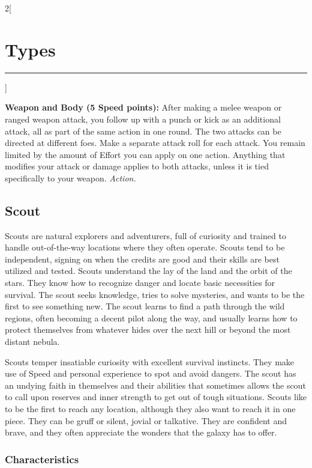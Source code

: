 \documentclass[a4paper,10pt,final]{book}
\newcommand{\HRule}{\rule{\linewidth}{0.5mm}} %
\newcommand{\newSection}[1]{\section*{#1} \addcontentsline{toc}{section}{#1} \label{sec:#1} \HRule}
\newcommand{\itemAbility}[2]{\textcolor{25gray}{\textbullet\textbf{ #1:}} {#2}\par}
\newcommand{\action}{\textit{ Action.}}
\newenvironment{docsection}[1]
{
  \begin{multicols*}{2}[\newSection{#1}]
}
{
  \end{multicols*}
  \newpage
}
\begin{document}
\begin{docsection}{Types}
\itemAbility{Weapon and Body (5 Speed points)}{After making a melee weapon or ranged weapon attack, you follow up with a punch or kick as an additional attack, all as part of the same action in one round. The two attacks can be directed at different foes. Make a separate attack roll for each attack. You remain limited by the amount of Effort you can apply on one action. Anything that modifies your attack or damage applies to both attacks, unless it is tied specifically to your weapon.\action}

\newpage


%
%
%
%
%
%
%
%
%
%
%
%
%
%
%
%
%
%
%


\subsection*{Scout} %
\label{sub:scout}

Scouts are natural explorers and adventurers, full of curiosity and trained to handle out-of-the-way locations where they often operate. Scouts tend to be independent, signing on when the credits are good and their skills are best utilized and tested. Scouts understand the lay of the land and the orbit of the stars. They know how to recognize danger and locate basic necessities for survival. The scout seeks knowledge, tries to solve mysteries, and wants to be the first to see something new. The scout learns to find a path through the wild regions, often becoming a decent pilot along the way, and usually learns how to protect themselves from whatever hides over the next hill or beyond the most distant nebula.

Scouts temper insatiable curiosity with excellent survival instincts. They make use of Speed and personal experience to spot and avoid dangers. The scout has an undying faith in themselves and their abilities that sometimes allows the scout to call upon reserves and inner strength to get out of tough situations. Scouts like to be the first to reach any location, although they also want to reach it in one piece. They can be gruff or silent, jovial or talkative. They are confident and brave, and they often appreciate the wonders that the galaxy has to offer.

\subsubsection*{Characteristics}
\label{subsub:scoutCharacteristics}


\end{docsection}
\end{document}
